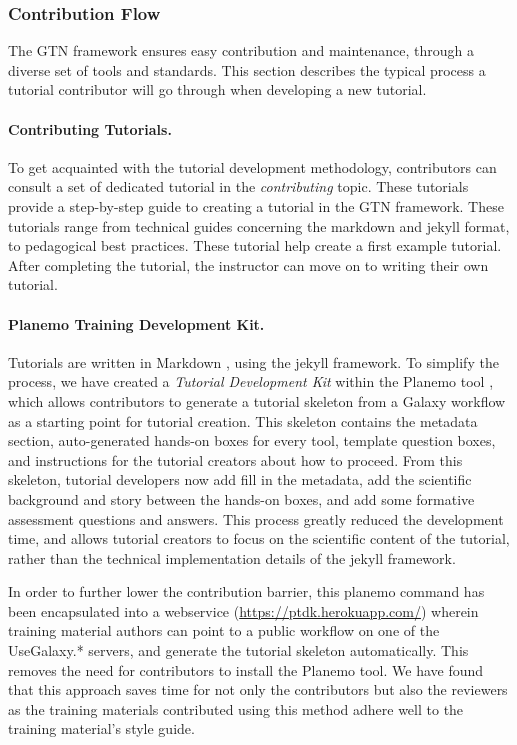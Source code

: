 \documentclass[10pt,letterpaper]{article}
\begin{document}
\subsubsection*{Contribution Flow}

The GTN framework ensures easy contribution and maintenance, through a diverse set of tools and standards.
This section describes the typical process a tutorial contributor will go through when developing a new tutorial.

\paragraph*{Contributing Tutorials.} To get acquainted with the tutorial development methodology, contributors can consult a set of dedicated tutorial in the \emph{contributing} topic. These tutorials provide a step-by-step guide to creating a tutorial in the GTN framework. These tutorials range from technical guides concerning the markdown and jekyll format, to pedagogical best practices. These tutorial help create a first example tutorial. After completing the tutorial, the instructor can move on to writing their own tutorial.

\paragraph*{Planemo Training Development Kit.} Tutorials are written in Markdown \cite{}, using the jekyll \cite{} framework.
To simplify the process, we have created a \emph{Tutorial Development Kit} within the Planemo tool \cite{TODO}, which allows contributors to generate a tutorial skeleton from a Galaxy workflow as a starting point for tutorial creation.
This skeleton contains the metadata section, auto-generated hands-on boxes for every tool, template question boxes, and instructions for the tutorial creators about how to proceed. From this skeleton, tutorial developers now add fill in the metadata, add the scientific background and story between the hands-on boxes, and add some formative assessment questions and answers.
This process greatly reduced the development time, and allows tutorial creators to focus on the scientific content of the tutorial, rather than the technical implementation details of the jekyll framework.

In order to further lower the contribution barrier, this planemo command has been encapsulated into a webservice (\url{https://ptdk.herokuapp.com/}) wherein training material authors can point to a public workflow on one of the UseGalaxy.* servers, and generate the tutorial skeleton automatically.
This removes the need for contributors to install the Planemo tool.
 We have found that this approach saves time for not only the contributors but also the reviewers as the training materials contributed using this method adhere well to the training material’s style guide.
\end{document}
